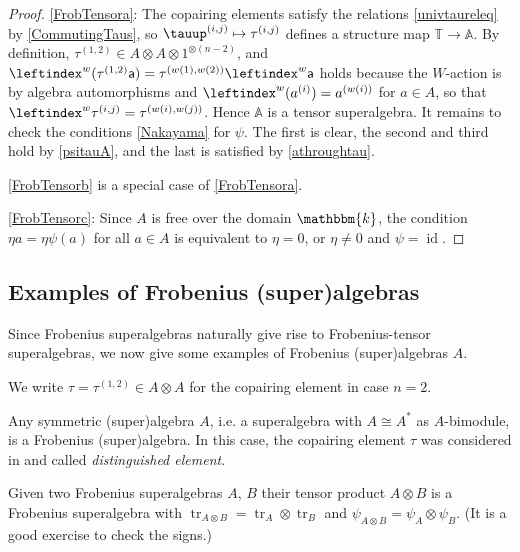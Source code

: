 \documentclass[a4paper,11pt]{amsart}
\numberwithin{equation}{subsection}
\theoremstyle{definition}
\theoremstyle{theorem}
\theoremstyle{remark}
\newcommand\Sym{W}
\newcommand\ba{\mathsf{a}}
\newcommand\op{\operatorname}
\newcommand{\ttau}{\tauup}
\newcommand\kk{\mathbbm{k}}
\newcommand\Tos{\mathbb{T}}
\newcommand{\Ao}{\mathbb{A}}
\begin{document}
 \begin{proof}
 \autoref{FrobTensora}: The copairing elements satisfy the relations \autoref{univtaureleq} by
 \autoref{CommutingTaus}, so $\ttau^{(i,j)}\mapsto\tau^{(i,j)}$ defines a structure map
 $\Tos\rightarrow\Ao$. By definition, $\tau^{(1,2)}\in A\otimes A\otimes1^{\otimes(n-2)}$, and
 $\leftindex^w(\tau^{(1,2)}\ba)=\tau^{(w(1),w(2))}\leftindex^w\ba$ holds because the $\Sym$-action
is by algebra automorphisms and $\leftindex^w(a^{(i)})=a^{(w(i))}$ for $a\in A$, so that $\leftindex^w\tau^{(i,j)}=\tau^{(w(i),w(j))}$. Hence $\Ao$ is a  tensor superalgebra. It remains to check the conditions \autoref{Nakayama} for $\psi$. The first is clear, the second and third hold by \autoref{psitauA}, and the last is satisfied by \autoref{athroughtau}.

 \autoref{FrobTensorb} is a special case of \autoref{FrobTensora}.

 \autoref{FrobTensorc}: Since $A$ is free over the domain $\kk$, the condition $\eta a=\eta\psi(a)$
 for all $a\in A$ is equivalent to $\eta=0$, or $\eta\ne0$ and $\psi=\op{id}$.
  \end{proof}


\subsection{Examples of Frobenius (super)algebras}\label{Frobeniusalgex}
Since Frobenius superalgebras naturally give rise to Frobenius-tensor superalgebras, we now give
some examples of Frobenius (super)algebras $A$.

We write $\tau=\tau^{(1,2)}\in A\otimes A$ for the copairing element in case $n=2$.

  \begin{Example}
  Any symmetric (super)algebra $A$, i.e. a superalgebra with $A\cong A^*$ as $A$-bimodule, is a Frobenius (super)algebra. In this
  case,  the copairing element
  $\tau$ was considered in \cite{KleshchevMuth} and called \emph{distinguished element}.
  \end{Example}

\begin{Example}\label{tensorFrob}Given two Frobenius superalgebras $A$, $B$ their tensor product $A\otimes B$ is a Frobenius superalgebra  with $\op{tr}_{A\otimes B}=\op{tr}_A\otimes \op{tr}_B$  and $\psi_{A\otimes B}=\psi_A\otimes \psi_B$. (It is a good exercise to check the signs.)
\end{Example}
\end{document}
